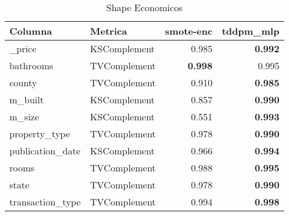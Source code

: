 \begin{table}[H]
\centering
\caption{Shape Economicos}
\label{table-shape-economicos-b-1}
\begin{tabular}{|l|l|r|r|}
\hline
\rowcolor[gray]{0.8}
Columna & Metrica & smote-enc & tddpm\_mlp \\
\hline \_price & KSComplement & 0.985 & \bfseries 0.992 \\
\hline bathrooms & TVComplement & \bfseries 0.998 & 0.995 \\
\hline county & TVComplement & 0.910 & \bfseries 0.985 \\
\hline m\_built & KSComplement & 0.857 & \bfseries 0.990 \\
\hline m\_size & KSComplement & 0.551 & \bfseries 0.993 \\
\hline property\_type & TVComplement & 0.978 & \bfseries 0.990 \\
\hline publication\_date & KSComplement & 0.966 & \bfseries 0.994 \\
\hline rooms & TVComplement & 0.988 & \bfseries 0.995 \\
\hline state & TVComplement & 0.978 & \bfseries 0.990 \\
\hline transaction\_type & TVComplement & 0.994 & \bfseries 0.998 \\
\hline
\end{tabular}
\end{table}
